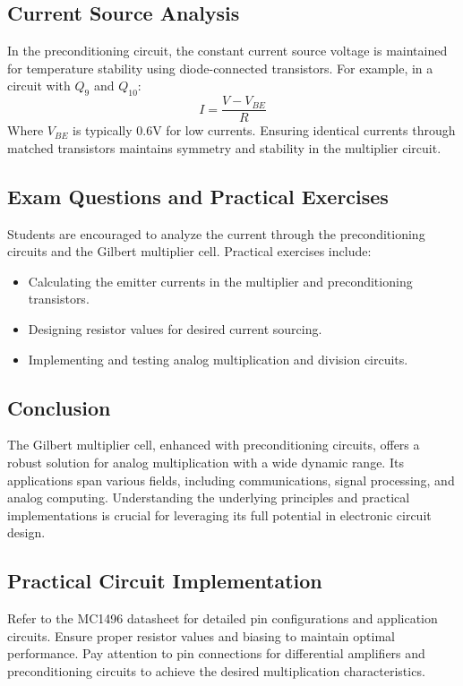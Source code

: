 \documentclass[a4paper,9pt,twoside,openany,twocolumn]{memoir}
\begin{document}
\subsection{Current Source Analysis}
In the preconditioning circuit, the constant current source voltage is maintained for temperature stability using diode-connected transistors. For example, in a circuit with \( Q_9 \) and \( Q_{10} \):
\[
I = \frac{V - V_{BE}}{R}
\]
Where \( V_{BE} \) is typically 0.6V for low currents. Ensuring identical currents through matched transistors maintains symmetry and stability in the multiplier circuit.

\subsection{Exam Questions and Practical Exercises}
Students are encouraged to analyze the current through the preconditioning circuits and the Gilbert multiplier cell. Practical exercises include:
\begin{itemize}
    \item Calculating the emitter currents in the multiplier and preconditioning transistors.
    \item Designing resistor values for desired current sourcing.
    \item Implementing and testing analog multiplication and division circuits.
\end{itemize}

\subsection{Conclusion}
The Gilbert multiplier cell, enhanced with preconditioning circuits, offers a robust solution for analog multiplication with a wide dynamic range. Its applications span various fields, including communications, signal processing, and analog computing. Understanding the underlying principles and practical implementations is crucial for leveraging its full potential in electronic circuit design.

\subsection{Practical Circuit Implementation}
Refer to the MC1496 datasheet for detailed pin configurations and application circuits. Ensure proper resistor values and biasing to maintain optimal performance. Pay attention to pin connections for differential amplifiers and preconditioning circuits to achieve the desired multiplication characteristics.
\end{document}
